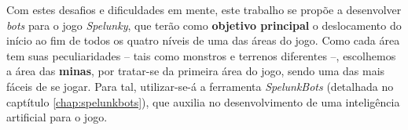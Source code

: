 Com estes desafios e dificuldades em mente, este trabalho se propõe a
desenvolver \textit{bots} para o jogo \textit{Spelunky}, que terão como
\textbf{objetivo principal} o deslocamento do início ao fim de todos os quatro
níveis de uma das áreas do jogo. Como cada área tem suas peculiaridades -- tais
como monstros e terrenos diferentes --, escolhemos a área das \textbf{minas},
por tratar-se da primeira área do jogo, sendo uma das mais fáceis de se jogar.
Para tal, utilizar-se-á a ferramenta \textit{SpelunkBots} (detalhada no
captítulo \ref{chap:spelunkbots}), que auxilia no desenvolvimento de uma
inteligência artificial para o jogo.
